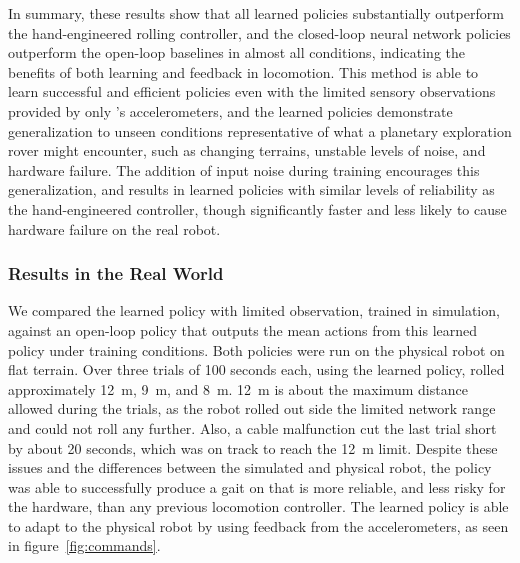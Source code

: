 In summary, these results show that all learned policies substantially outperform the hand-engineered rolling controller, and the closed-loop neural network policies outperform the open-loop baselines in almost all conditions, indicating the benefits of both learning and feedback in \SB{} locomotion. 
This method is able to learn successful and efficient policies even with the limited sensory observations provided by only \SB{}'s accelerometers, and the learned policies demonstrate generalization to unseen conditions representative of what a planetary exploration rover might encounter, such as changing terrains, unstable levels of noise, and hardware failure. 
The addition of input noise during training encourages this generalization, and results in learned policies with similar levels of reliability as the hand-engineered controller, though significantly faster and less likely to cause hardware failure on the real robot.

\subsubsection{Results in the Real World}
\label{sec:realresults}

We compared the learned policy with limited observation, trained in simulation, against an open-loop policy that outputs the mean actions from this learned policy under training conditions. Both policies were run on the physical \SB{} robot on flat terrain. 
Over three trials of 100 seconds each, using the learned policy, \SB{} rolled approximately \SI{12}{\meter}, \SI{9}{\meter}, and \SI{8}{\meter}.
\SI{12}{\meter} is about the maximum distance allowed during the trials, as the robot rolled out side the limited network range and could not roll any further.
Also, a cable malfunction cut the last trial short by about 20 seconds, which was on track to reach the \SI{12}{\meter} limit. 
Despite these issues and the differences between the simulated and physical robot, the policy was able to successfully produce a gait on \SB{} that is more reliable, and less risky for the hardware, than any previous locomotion controller.
The learned policy is able to adapt to the physical \SB{} robot by using feedback from the accelerometers, as seen in figure~\ref{fig:commands}.

